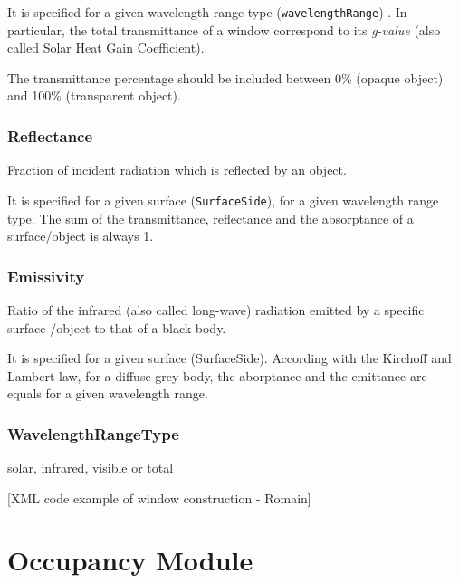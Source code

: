 \documentclass[a4paper,12pt]{article}
\let\stdsection\section%
\renewcommand\section{\newpage\stdsection}
\begin{document}
It is specified for a given wavelength range type
(\texttt{wavelengthRange}) . In particular, the total transmittance of a
window correspond to its \emph{g-value} (also called Solar Heat Gain
Coefficient).

The transmittance percentage should be included between 0\% (opaque
object) and 100\% (transparent object).

\subsubsection{Reflectance}\label{reflectance}

Fraction of incident radiation which is reflected by an object.

It is specified for a given surface (\texttt{SurfaceSide}), for a given
wavelength range type. The sum of the transmittance, reflectance and the
absorptance of a surface/object is always 1.

\subsubsection{Emissivity}\label{emissivity}

Ratio of the infrared (also called long-wave) radiation emitted by a
specific surface /object to that of a black body.

It is specified for a given surface (SurfaceSide). According with the
Kirchoff and Lambert law, for a diffuse grey body, the aborptance and
the emittance are equals for a given wavelength range.

\subsubsection{WavelengthRangeType}\label{wavelengthrangetype}

solar, infrared, visible or total

{[}XML code example of window construction - Romain{]}

\section{Occupancy Module}\label{occupancy-module}
\end{document}
